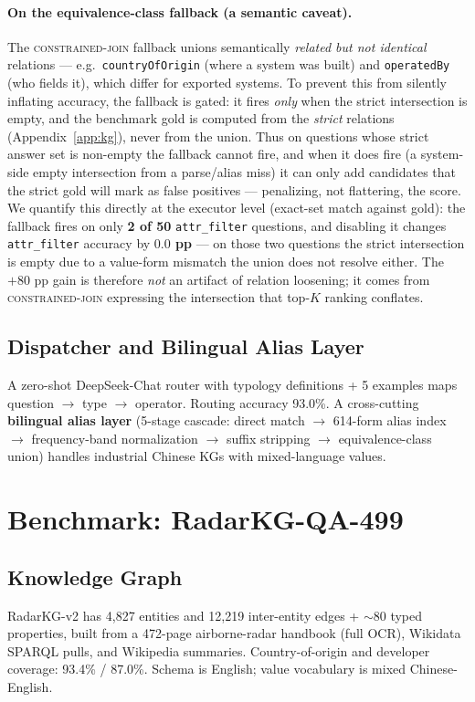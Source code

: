 \documentclass[11pt,a4paper]{article}
\newcommand{\qtype}[1]{\texttt{\small #1}}
\newcommand{\op}[1]{\textsc{\small #1}}
\begin{document}
\paragraph{On the equivalence-class fallback (a semantic caveat).}
The \op{constrained-join} fallback unions semantically \emph{related but not identical} relations --- e.g.\ \texttt{countryOfOrigin} (where a system was built) and \texttt{operatedBy} (who fields it), which differ for exported systems. To prevent this from silently inflating accuracy, the fallback is gated: it fires \emph{only} when the strict intersection is empty, and the benchmark gold is computed from the \emph{strict} relations (Appendix~\ref{app:kg}), never from the union. Thus on questions whose strict answer set is non-empty the fallback cannot fire, and when it does fire (a system-side empty intersection from a parse/alias miss) it can only add candidates that the strict gold will mark as false positives --- penalizing, not flattering, the score. We quantify this directly at the executor level (exact-set match against gold): the fallback fires on only \textbf{2 of 50} \qtype{attr\_filter} questions, and disabling it changes \qtype{attr\_filter} accuracy by \textbf{$0.0$ pp} --- on those two questions the strict intersection is empty due to a value-form mismatch the union does not resolve either. The $+80$ pp gain is therefore \emph{not} an artifact of relation loosening; it comes from \op{constrained-join} expressing the intersection that top-$K$ ranking conflates.

\subsection{Dispatcher and Bilingual Alias Layer}
A zero-shot DeepSeek-Chat router with typology definitions + 5 examples maps question $\to$ type $\to$ operator. Routing accuracy 93.0\%. A cross-cutting \textbf{bilingual alias layer} (5-stage cascade: direct match $\to$ 614-form alias index $\to$ frequency-band normalization $\to$ suffix stripping $\to$ equivalence-class union) handles industrial Chinese KGs with mixed-language values.

\section{Benchmark: RadarKG-QA-499}
\label{sec:benchmark}

\subsection{Knowledge Graph}
RadarKG-v2 has 4{,}827 entities and 12{,}219 inter-entity edges + ${\sim}80$ typed properties, built from a 472-page airborne-radar handbook (full OCR), Wikidata SPARQL pulls, and Wikipedia summaries. Country-of-origin and developer coverage: 93.4\% / 87.0\%. Schema is English; value vocabulary is mixed Chinese-English.
\end{document}

